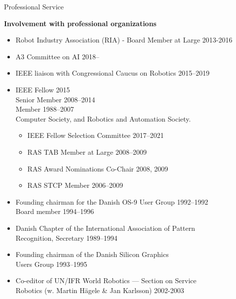 \documentclass{article}
\begin{document}
\begin{cv}
\begin{cvlist}{Professional Service}
\item {\bf Involvement with professional organizations}
  \begin{itemize}
  \item Robot Industry Association (RIA) - Board Member at Large
    \cftdotfill{\cftdotsep} 2013-2016
  \item A3 Committee on AI \cftdotfill{\cftdotsep} 2018--
  \item IEEE liaison with Congressional Caucus on Robotics
    \cftdotfill{\cftdotsep}  2015--2019
  \item IEEE Fellow \cftdotfill{\cftdotsep} 2015\\
    Senior Member   \cftdotfill{\cftdotsep} 2008--2014\\
    Member \cftdotfill{\cftdotsep}    1988--2007\\
    Computer Society, and Robotics and Automation Society.
    \begin{itemize}
    \item IEEE Fellow Selection Committee \cftdotfill{\cftdotsep} 2017--2021
    \item RAS TAB Member at Large \cftdotfill{\cftdotsep} 2008--2009
    \item RAS Award Nominations Co-Chair \cftdotfill{\cftdotsep} 2008,
      2009
    \item RAS STCP Member \cftdotfill{\cftdotsep} 2006--2009
    \end{itemize}
  \item Founding chairman for the Danish OS-9 User Group
    \cftdotfill{\cftdotsep} 1992--1992\\ Board member
    \cftdotfill{\cftdotsep} 1994--1996
  \item Danish Chapter of the International Association of
    Pattern\\ Recognition, Secretary \cftdotfill{\cftdotsep}
    1989--1994
  \item Founding chairman of the Danish Silicon Graphics \\Users Group
    \cftdotfill{\cftdotsep} 1993--1995
  \item Co-editor of UN/IFR World Robotics --- Section on
    Service\\ Robotics (w. Martin H\"agele \& Jan Karlsson)
    \cftdotfill{\cftdotsep} 2002-2003
  \end{itemize}


\end{cvlist}
\end{cv}
\end{document}
